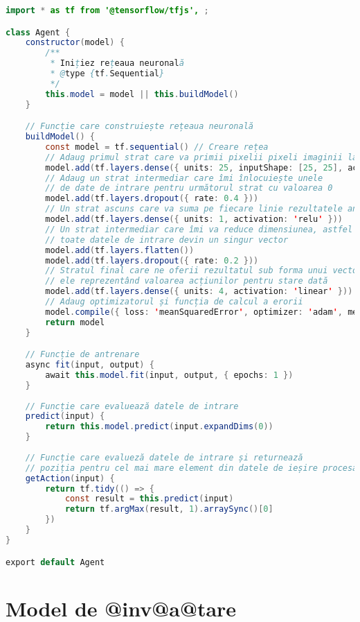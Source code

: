 \begin{lstlisting}[language=Java, caption={Structura clasei Agent}, label={exem-agent}]
import * as tf from '@tensorflow/tfjs', ;

class Agent {
    constructor(model) {
        /**
         * Inițiez rețeaua neuronală
         * @type {tf.Sequential}
         */
        this.model = model || this.buildModel()
    }

    // Funcție care construiește rețeaua neuronală
    buildModel() {
        const model = tf.sequential() // Creare rețea
        // Adaug primul strat care va primii pixelii pixeli imaginii labirintului
        model.add(tf.layers.dense({ units: 25, inputShape: [25, 25], activation: 'relu' }))
        // Adaug un strat intermediar care îmi înlocuiește unele  
        // de date de intrare pentru următorul strat cu valoarea 0
        model.add(tf.layers.dropout({ rate: 0.4 }))
        // Un strat ascuns care va suma pe fiecare linie rezultatele anterioare
        model.add(tf.layers.dense({ units: 1, activation: 'relu' }))
        // Un strat intermediar care îmi va reduce dimensiunea, astfel din matrice toate
        // toate datele de intrare devin un singur vector
        model.add(tf.layers.flatten())
        model.add(tf.layers.dropout({ rate: 0.2 }))
        // Stratul final care ne oferii rezultatul sub forma unui vector de 4 elemente
        // ele reprezentând valoarea acțiunilor pentru stare dată
        model.add(tf.layers.dense({ units: 4, activation: 'linear' }))
        // Adaug optimizatorul și funcția de calcul a erorii
        model.compile({ loss: 'meanSquaredError', optimizer: 'adam', metrics: ['accuracy'] })
        return model
    }

    // Funcție de antrenare
    async fit(input, output) {
        await this.model.fit(input, output, { epochs: 1 })
    }
    
    // Funcție care evaluează datele de intrare
    predict(input) {
        return this.model.predict(input.expandDims(0))
    }
    
    // Funcție care evalueză datele de intrare și returnează
    // poziția pentru cel mai mare element din datele de ieșire procesate
    getAction(input) {
        return tf.tidy(() => {
            const result = this.predict(input)
            return tf.argMax(result, 1).arraySync()[0]
        })
    }
}

export default Agent
\end{lstlisting}

\section{Model de @inv@a@tare}

